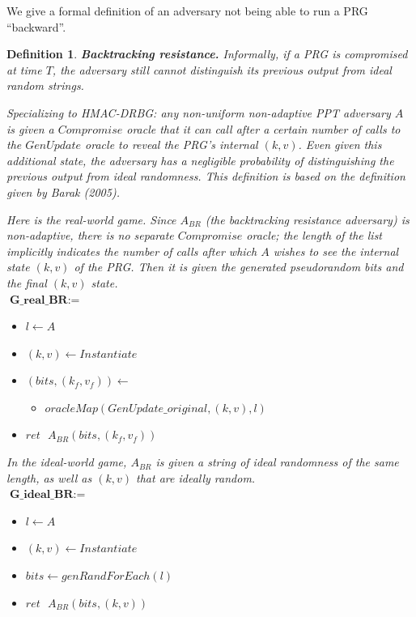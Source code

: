 \documentclass[12pt,lot, lof]{puthesis}
\newenvironment{game}
{ \begin{itemize}[noitemsep,nolistsep] 
}
{ \end{itemize}                  }
\newcommand{\s} {\textrm{ }}
\newcommand{\lar}{\leftarrow}
\newtheorem{dfn}[thm]{Definition}
\begin{document}
{We give a formal definition of an adversary not being able to run a PRG ``backward''.

\begin{dfn} \textbf{Backtracking resistance.} Informally, if a PRG is compromised at time $T$, the adversary still cannot distinguish its previous output from ideal random strings. 

Specializing to HMAC-DRBG: any non-uniform non-adaptive PPT adversary $A$ is given a $Compromise$ oracle that it can call after a certain number of calls to the $GenUpdate$ oracle to reveal the PRG's internal $(k,v)$. Even given this additional state, the adversary has a negligible probability of distinguishing the previous output from ideal randomness. This definition is based on the definition given by Barak (2005).

Here is the real-world game. Since $A_{BR}$ (the backtracking resistance adversary) is non-adaptive, there is no separate $Compromise$ oracle; the length of the list implicitly indicates the number of calls after which $A$ wishes to see the internal state $(k,v)$ of the PRG. Then it is given the generated pseudorandom bits and the final $(k,v)$ state.\\

$\textbf{G\_real\_BR} := $
\begin{game}
\item[] $l \leftarrow A$
\item[] $(k,v) \leftarrow Instantiate$
\item[] $(bits, (k_f, v_f)) \lar$
  \begin{game}
    \item[] $oracleMap(GenUpdate\_original,(k, v),l)$
  \end{game}
\item[] $ret \s A_{BR}(bits, (k_f, v_f))$ \\
\end{game}

In the ideal-world game, $A_{BR}$ is given a string of ideal randomness of the same length, as well as $(k,v)$ that are ideally random.\\

$\textbf{G\_ideal\_BR} := $
\begin{game}
\item[] $l \leftarrow A$ 
\item[] $(k,v) \leftarrow Instantiate$
\item[] $bits \leftarrow genRandForEach(l)$
\item[] $ret \s A_{BR}(bits, (k,v))$ \\
\end{game}


\end{dfn}}
\end{document}
